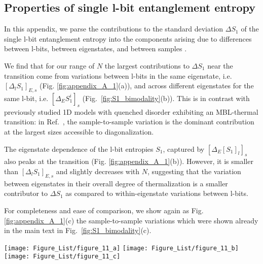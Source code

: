 \documentclass[aps,pra,twocolumn,a4paper,showpacs,superscriptaddress,floatfix,10pt]{revtex4}
\begin{document}
\begin{widetext}
\section{Properties of single l-bit entanglement entropy}
\label{app:std_dev_parsing}

In this appendix, we parse the contributions to the standard deviation $\Delta S_1$ of the single l-bit entanglement entropy into the components arising due to differences between l-bits, between eigenstates, and between samples \cite{Khemani:2016aa}.

We find that for our range of $N$ the largest contributions to $\Delta S_1$ near the transition come from variations between l-bits in the same eigenstate, i.e. $[\Delta_l S_1]_{E,s}$ (Fig. \ref{fig:appendix_A_1}(a)), and across different eigenstates for the same l-bit, i.e. $[\Delta_E S_1^i]_{s}$ (Fig.~\ref{fig:S1_bimodality}(b)).
This is in contrast with previously studied 1D models with quenched disorder exhibiting an MBL-thermal transition: in Ref.~\cite{Khemani:2016aa}, the sample-to-sample variation is the dominant contribution at the largest sizes accessible to diagonalization.

The eigenstate dependence of the l-bit entropies $S_1$, captured by $[\Delta_{E}[S_1]_{l}]_s$ also peaks at the transition (Fig. \ref{fig:appendix_A_1}(b)). However, it is smaller than $[\Delta_l S_1]_{E,s}$ and slightly decreases with $N$, suggesting that the variation between eigenstates in their overall degree of thermalization is a smaller contributor to $\Delta S_1$ as compared to within-eigenstate variations between l-bits.

For completeness and ease of comparison, we show again as Fig. \ref{fig:appendix_A_1}(c) the sample-to-sample variations which were shown already in the main text in Fig.~\ref{fig:S1_bimodality}(c).

\begin{figure*}[h]
\texttt{[image: Figure\_List/figure\_11\_a]}
\texttt{[image: Figure\_List/figure\_11\_b]}
\texttt{[image: Figure\_List/figure\_11\_c]}
\caption{\label{fig:appendix_A_1} (a) Standard deviation of $S_1$ over l-bits in the same eigenstate, averaged over different eigenstates and samples. (b) Average over samples of the standard deviation over eigenstates of the l-bit-averaged $S_1$.   (c) Standard deviation over samples of $S_1$ averaged within each sample over eigenstates and l-bits.}
\end{figure*}


\end{widetext}
\end{document}
